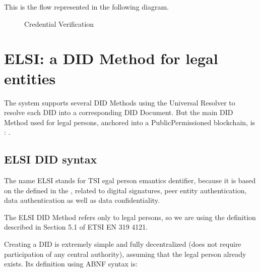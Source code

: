 \documentclass[letterpaper,10pt,english]{sphinxmanual}
\begin{document}
\sphinxAtStartPar
This is the flow represented in the following diagram.

\begin{figure}[htbp]
\centering
\capstart

\noindent{}
\caption{Credential Verification}\label{\detokenize{privacycred:id8}}\end{figure}


\section{ELSI: a DID Method for legal entities}
\label{\detokenize{privacycred:elsi-a-did-method-for-legal-entities}}
\sphinxAtStartPar
The system supports several DID Methods using the Universal Resolver to resolve each DID into a corresponding DID Document.
But the main DID Method used for legal persons, anchored into a Public\sphinxhyphen{}Permissioned blockchain, is : .


\subsection{ELSI DID syntax}
\label{\detokenize{privacycred:elsi-did-syntax}}
\sphinxAtStartPar
The name ELSI stands for TSI egal person emantics dentifier, because it is based on the  defined in the , related to digital signatures, peer entity authentication, data authentication as well as data confidentiality.

\sphinxAtStartPar
The ELSI DID Method refers only to legal persons, so we are using the  definition described in Section 5.1 of ETSI EN 319 412\sphinxhyphen{}1.

\sphinxAtStartPar
Creating a DID is extremely simple and fully decentralized (does not require participation of any central authority), assuming that the legal person already exists. Its definition using ABNF syntax is:

\begin{sphinxVerbatim}[commandchars=\\\{\}]
   
\end{sphinxVerbatim}
\end{document}
